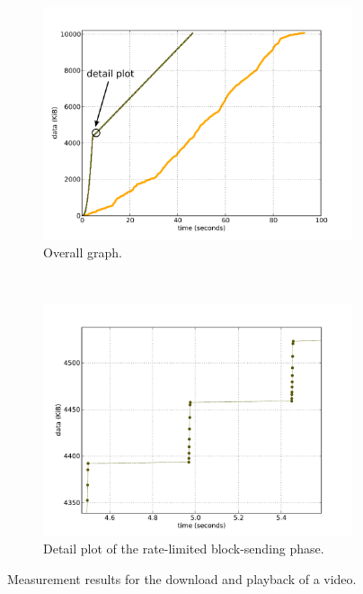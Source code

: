 \begin{figure}
	\centering
    	\begin{subfigure}[b]{0.50\textwidth}
                \centering
                \includegraphics[width=\textwidth]{images/streaming/blocktransfer-mod.pdf}
                \caption{Overall graph.}
                \label{fig:blocktransfer-overall}
        \end{subfigure}%
        ~
    	\begin{subfigure}[b]{0.50\textwidth}
                \centering
                \includegraphics[width=\textwidth]{images/streaming/blocktransferdetail.pdf}
                \caption{Detail plot of the rate-limited block-sending phase.}
                \label{fig:blocktransfer-detail}
        \end{subfigure}
\caption{Measurement results for the download and playback of a video.}
\label{fig:blocktransfer}
\end{figure}




